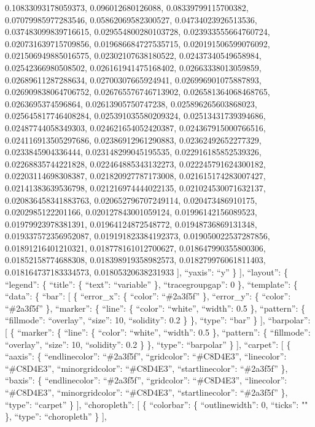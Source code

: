 \documentclass[
]{article}
\begin{document}
0.10833093178059373, 0.096012680126088, 0.08339799115700382,
0.07079985977283546, 0.05862069582300527, 0.04734023926513536,
0.037483099839716615, 0.029554800280103728, 0.023933555664760724,
0.020731639715709856, 0.019686684727535715, 0.020191506599076092,
0.021506949885016575, 0.02302107638180522, 0.02437340549658984,
0.02542366980508502, 0.026161941475168402, 0.02663338013059859,
0.02689611287288634, 0.02700307665924941, 0.026996901075887893,
0.026909838064706752, 0.026765576746713902, 0.026581364068468765,
0.0263695374596864, 0.02613905750747238, 0.025896265603868023,
0.025645817746408284, 0.025391035580209324, 0.02513431739394686,
0.02487744058349303, 0.024621654052420387, 0.024367915000766516,
0.024116913505297686, 0.02386912961290883, 0.02362492652277329,
0.0233845904336444, 0.023148299045195535, 0.022916185852539326,
0.02268835744221828, 0.022464885343132273, 0.022245791624300182,
0.02203114698308387, 0.021820927787173008, 0.021615174283007427,
0.02141383639536798, 0.021216974444022135, 0.021024530071632137,
0.020836458341883763, 0.020652796707249114, 0.020473486910175,
0.0202985122201166, 0.020127843001059124, 0.01996142156089523,
0.01979923978381391, 0.01964124872548772, 0.01948736869131348,
0.019337572356952087, 0.019191823384192373, 0.019050022537287856,
0.01891216401210321, 0.018778161012700627, 0.018647990355800306,
0.01852158774688308, 0.018398919358982573, 0.018279976061811403,
0.018164737183334573, 0.01805320638231933 {]}, ``yaxis'': ``y'' \} {]},
``layout'': \{ ``legend'': \{ ``title'': \{ ``text'': ``variable'' \},
``tracegroupgap'': 0 \}, ``template'': \{ ``data'': \{ ``bar'': {[} \{
``error\_x'': \{ ``color'': ``\#2a3f5f'' \}, ``error\_y'': \{ ``color'':
``\#2a3f5f'' \}, ``marker'': \{ ``line'': \{ ``color'': ``white'',
``width'': 0.5 \}, ``pattern'': \{ ``fillmode'': ``overlay'', ``size'':
10, ``solidity'': 0.2 \} \}, ``type'': ``bar'' \} {]}, ``barpolar'': {[}
\{ ``marker'': \{ ``line'': \{ ``color'': ``white'', ``width'': 0.5 \},
``pattern'': \{ ``fillmode'': ``overlay'', ``size'': 10, ``solidity'':
0.2 \} \}, ``type'': ``barpolar'' \} {]}, ``carpet'': {[} \{ ``aaxis'':
\{ ``endlinecolor'': ``\#2a3f5f'', ``gridcolor'': ``\#C8D4E3'',
``linecolor'': ``\#C8D4E3'', ``minorgridcolor'': ``\#C8D4E3'',
``startlinecolor'': ``\#2a3f5f'' \}, ``baxis'': \{ ``endlinecolor'':
``\#2a3f5f'', ``gridcolor'': ``\#C8D4E3'', ``linecolor'': ``\#C8D4E3'',
``minorgridcolor'': ``\#C8D4E3'', ``startlinecolor'': ``\#2a3f5f'' \},
``type'': ``carpet'' \} {]}, ``choropleth'': {[} \{ ``colorbar'': \{
``outlinewidth'': 0, ``ticks'': "" \}, ``type'': ``choropleth'' \} {]},
\end{document}
